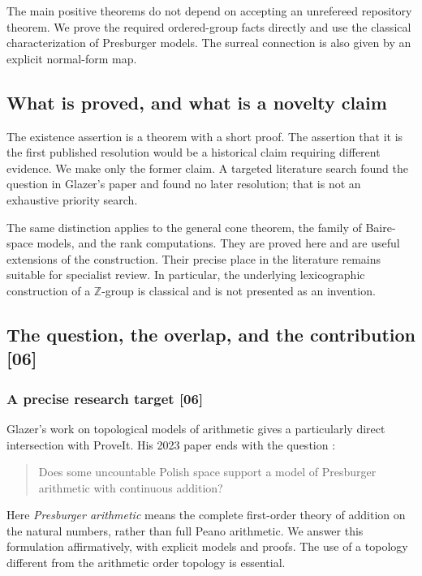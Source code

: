 \documentclass[11pt]{article}
\numberwithin{equation}{section}
\theoremstyle{definition}
\theoremstyle{remark}
\newcommand{\Z}{\mathbb Z}
\newcommand{\src}[1]{\textup{\textsf{\small[#1]}}}
\begin{document}
The main positive theorems do not depend on accepting an unrefereed
repository theorem. We prove the required ordered-group facts directly and
use the classical characterization of Presburger models. The surreal
connection is also given by an explicit normal-form map.

\subsection{What is proved, and what is a novelty claim}

The existence assertion is a theorem with a short proof. The assertion that
it is the first published resolution would be a historical claim requiring
different evidence. We make only the former claim. A targeted literature
search found the question in Glazer's paper and found no later resolution;
that is not an exhaustive priority search.

The same distinction applies to the general cone theorem, the family of
Baire-space models, and the rank computations. They are proved here and
are useful extensions of the construction. Their precise place in the
literature remains suitable for specialist review. In particular, the
underlying lexicographic construction of a $\Z$-group is classical and is
not presented as an invention.

\subsection{The question, the overlap, and the contribution \src{06}}
\label{pma:cp:sec:scope}

\subsubsection{A precise research target \src{06}}

Glazer's work on topological models of arithmetic gives a particularly
direct intersection with ProveIt. His 2023 paper ends with the question
\cite[Question~2]{Glazer}:
\begin{quote}
Does some uncountable Polish space support a model of Presburger
arithmetic with continuous addition?
\end{quote}
Here \emph{Presburger arithmetic} means the complete first-order theory
of addition on the natural numbers, rather than full Peano arithmetic.
We answer this formulation affirmatively, with explicit models and
proofs. The use of a topology different from the arithmetic order topology
is essential.
\end{document}
